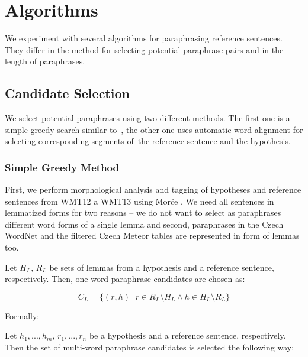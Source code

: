 \section{Algorithms}
\label{algorithm}
We experiment with several algorithms for paraphrasing reference sentences. 
They differ in the method for selecting potential paraphrase pairs and in the 
length of paraphrases.

\subsection{Candidate Selection}
We select potential paraphrases using two different methods. The first one is a 
simple greedy search similar to~\citet{kauchak}, the other one uses automatic word
alignment for selecting corresponding segments of~the reference sentence and the 
hypothesis.

\subsubsection{Simple Greedy Method}
First, we perform morphological analysis and tagging of hypotheses and 
reference sentences from WMT12 a WMT13 using Morče \citep{morce:2007}. 
We need all sentences in lemmatized forms for two reasons -- we do not want 
to select as paraphrases different word forms of a single lemma and second, 
paraphrases in the Czech WordNet and the filtered Czech Meteor tables are 
represented in form of lemmas too.

Let $ H_{L} $, $ R_{L} $ be sets of lemmas from a hypothesis and a reference 
sentence, respectively. Then, one-word paraphrase candidates are chosen as:

\begin{equation*}
C_{L} = \{(r,h) \, | \, r \in R_{L} \setminus H_{L} \wedge h \in H_{L} \setminus R_{L} \} 
\end{equation*}

 Formally:

Let $ h_1,...,h_m $, $ r_1,..., r_n $  be a hypothesis and a reference sentence,
respectively. Then the set of multi-word paraphrase candidates is selected the 
following way:

